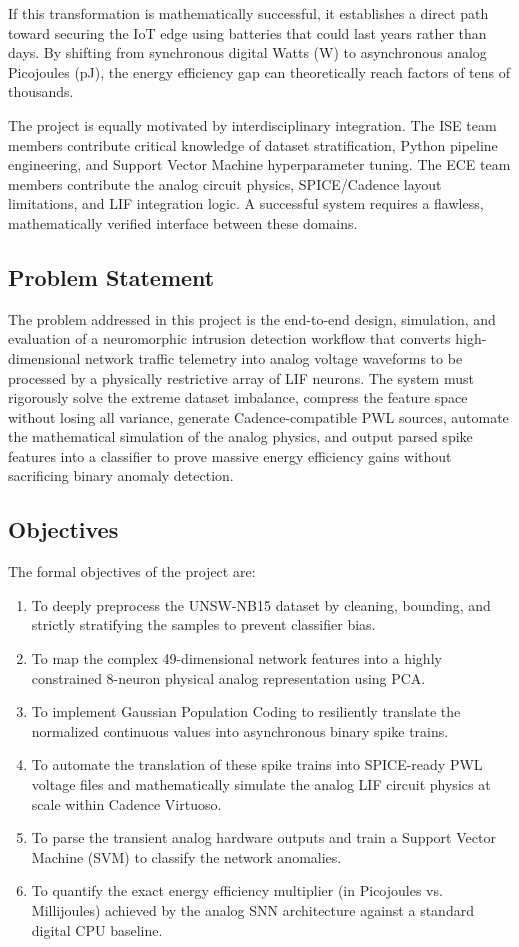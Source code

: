 \documentclass{ieeeaccess}
\begin{document}
If this transformation is mathematically successful, it establishes a direct path toward securing the IoT edge using batteries that could last years rather than days. By shifting from synchronous digital Watts (W) to asynchronous analog Picojoules (pJ), the energy efficiency gap can theoretically reach factors of tens of thousands.

The project is equally motivated by interdisciplinary integration. The ISE team members contribute critical knowledge of dataset stratification, Python pipeline engineering, and Support Vector Machine hyperparameter tuning. The ECE team members contribute the analog circuit physics, SPICE/Cadence layout limitations, and LIF integration logic. A successful system requires a flawless, mathematically verified interface between these domains.

\subsection{Problem Statement}

The problem addressed in this project is the end-to-end design, simulation, and evaluation of a neuromorphic intrusion detection workflow that converts high-dimensional network traffic telemetry into analog voltage waveforms to be processed by a physically restrictive array of LIF neurons. The system must rigorously solve the extreme dataset imbalance, compress the feature space without losing all variance, generate Cadence-compatible PWL sources, automate the mathematical simulation of the analog physics, and output parsed spike features into a classifier to prove massive energy efficiency gains without sacrificing binary anomaly detection.

\subsection{Objectives}

The formal objectives of the project are:
\begin{enumerate}
\item To deeply preprocess the UNSW-NB15 dataset by cleaning, bounding, and strictly stratifying the samples to prevent classifier bias.
\item To map the complex 49-dimensional network features into a highly constrained 8-neuron physical analog representation using PCA.
\item To implement Gaussian Population Coding to resiliently translate the normalized continuous values into asynchronous binary spike trains.
\item To automate the translation of these spike trains into SPICE-ready PWL voltage files and mathematically simulate the analog LIF circuit physics at scale within Cadence Virtuoso.
\item To parse the transient analog hardware outputs and train a Support Vector Machine (SVM) to classify the network anomalies.
\item To quantify the exact energy efficiency multiplier (in Picojoules vs. Millijoules) achieved by the analog SNN architecture against a standard digital CPU baseline.
\end{enumerate}
\end{document}
